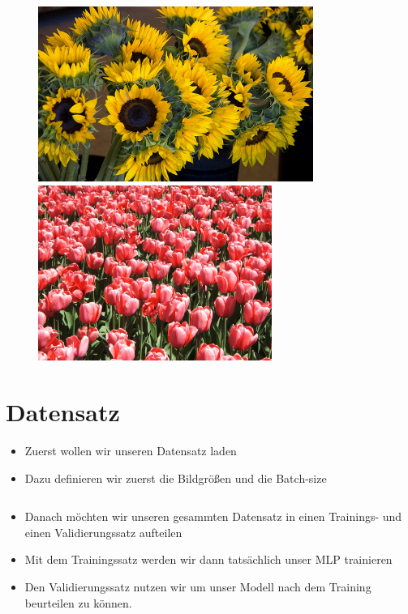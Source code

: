 \documentclass[t]{beamer}
\newcommand\pycode[1]{\inputminted[frame=lines, framesep=2mm, fontsize=\normalsize]{python}{#1}}
\begin{document}
\begin{frame}
\begin{figure}
\begin{minipage}{0.4\textwidth}
        \end{minipage}
    \end{figure}
    \begin{figure}
        \centering
        \begin{minipage}{0.4\textwidth}
            \centering
            \includegraphics[width=0.8\textwidth]{./teach-plots/sunflower.jpg} %
        \end{minipage}\hfill
        \begin{minipage}{0.4\textwidth}
            \centering
            \includegraphics[width=0.68\textwidth]{./teach-plots/tulip.jpg} %
        \end{minipage}
    \end{figure}
\end{frame}

\section{Datensatz}
\begin{frame}
    \begin{itemize}
        \item Zuerst wollen wir unseren Datensatz laden
        \item Dazu definieren wir zuerst die Bildgrößen und die Batch-size
        \pycode{./code-snippets/dataset-params.py}
        \item Danach möchten wir unseren gesammten Datensatz in einen Trainings- und einen Validierungssatz aufteilen
        \item Mit dem Trainingssatz werden wir dann tatsächlich unser MLP trainieren
        \item Den Validierungssatz nutzen wir um unser Modell nach dem Training beurteilen zu können.
    \end{itemize}
\end{frame}
\end{document}
